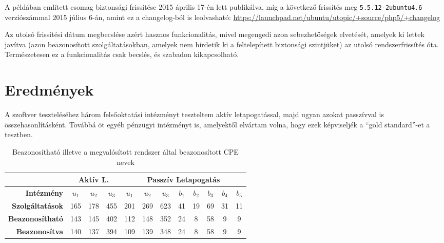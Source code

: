 	A példában említett csomag biztonsági frissítése 2015 április 17-én lett publikálva, míg a következő frissítés meg \texttt{5.5.12-2ubuntu4.6} verziószámmal 2015 július 6-án, amint ez a changelog-ból is leolvasható: \url{https://launchpad.net/ubuntu/utopic/+source/php5/+changelog}
	
	Az utolsó frissítési dátum megbecslése azért hasznos funkcionalitás, mivel megengedi azon sebezhetőségek elvetését, amelyek ki lettek javítva (azon beazonosított szolgáltatásokban, amelyek nem hirdetik ki a feltelepített biztonsági szintjüket) az utolsó rendszerfrissítés óta. Természetesen ez a funkcionalitás csak becslés, és szabadon kikapcsolható.

\section*{Eredmények}

	A szoftver teszteléséhez három felsőoktatási intézményt teszteltem aktív letapogatással, majd ugyan azokat passzívval is összehasonlításként. Továbbá öt egyéb pénzügyi intézményt is, amelyektől elvártam volna, hogy ezek képviseljék a ``gold standard''-et a tesztben.

	\begin{table}[H]
		\centering
		\begin{tabular}{r|ccc|ccc|ccccc|}
			\cline{2-12}
			\multicolumn{1}{l|}{}                         & \multicolumn{3}{c|}{\textbf{Aktív L.}} & \multicolumn{8}{c|}{\textbf{Passzív Letapogatás}}                                                             \\ \hline
			\multicolumn{1}{|r|}{\textbf{Intézmény}}      & \textbf{$u_1$}    & \textbf{$u_2$}    & \textbf{$u_3$}   & \textbf{$u_1$} & \textbf{$u_2$} & \textbf{$u_3$} & \textbf{$b_1$} & \textbf{$b_2$} & \textbf{$b_3$} & \textbf{$b_4$} & \textbf{$b_5$} \\ \hline
			\multicolumn{1}{|r|}{\textbf{Szolgáltatások}} & 165            & 178            & 455           & 201         & 269         & 623         & 41          & 19          & 69          & 31          & 11          \\
			\multicolumn{1}{|r|}{\textbf{Beazonosítható}} & 143            & 145            & 402           & 112         & 148         & 352         & 24          & 8           & 58          & 9           & 9           \\
			\multicolumn{1}{|r|}{\textbf{Beazonosítva}}   & 140            & 137            & 394           & 109         & 139         & 348         & 24          & 8           & 58          & 9           & 9           \\ \hline
		\end{tabular}
		\caption{Beazonosítható illetve a megvalósított rendszer által beazonosított CPE nevek}
		\label{cpeids_hu}
	\end{table}
	

